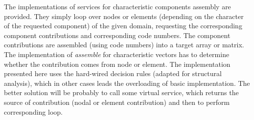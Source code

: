 \documentclass[a4paper]{article}
\newcommand{\service}[1]{{\em #1}}
\begin{document}
The implementations of services for characteristic components assembly
are provided. They simply loop over nodes or elements (depending on
the character of the requested component) of the given domain, requesting the
corresponding component contributions and corresponding code numbers. 
The component contributions are assembled (using code numbers) into
a target array or matrix. The implementation of \service{assemble} for
characteristic vectors has to determine whether the contribution comes
from node or element. The implementation presented here uses the
hard-wired decision rules (adapted for structural analysis), 
which in other cases leads the overloading of basic implementation. 
The better solution will be probably to call some virtual service,
which returns the source of contribution (nodal or element
contribution) and then to perform corresponding loop.
\end{document}
